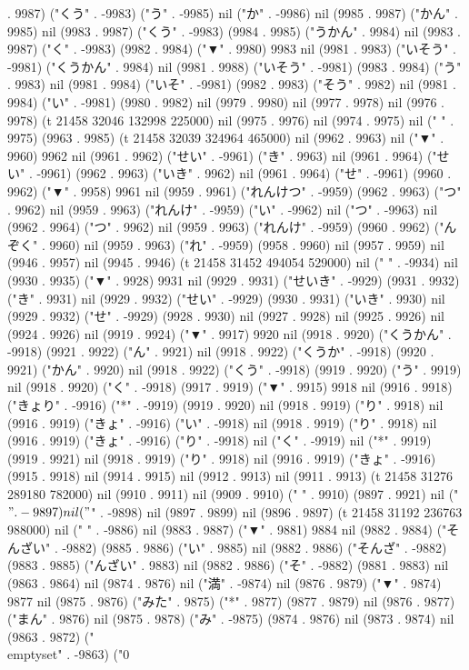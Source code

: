 . 9987) ("くう" . -9983) ("う" . -9985) nil ("か" . -9986) nil (9985 . 9987) ("かん" . 9985) nil (9983 . 9987) ("くう" . -9983) (9984 . 9985) ("うかん" . 9984) nil (9983 . 9987) ("く" . -9983) (9982 . 9984) ("▼" . 9980) 9983 nil (9981 . 9983) ("いそう" . -9981) ("くうかん" . 9984) nil (9981 . 9988) ("いそう" . -9981) (9983 . 9984) ("う" . 9983) nil (9981 . 9984) ("いそ" . -9981) (9982 . 9983) ("そう" . 9982) nil (9981 . 9984) ("い" . -9981) (9980 . 9982) nil (9979 . 9980) nil (9977 . 9978) nil (9976 . 9978) (t 21458 32046 132998 225000) nil (9975 . 9976) nil (9974 . 9975) nil (" " . 9975) (9963 . 9985) (t 21458 32039 324964 465000) nil (9962 . 9963) nil ("▼" . 9960) 9962 nil (9961 . 9962) ("せい" . -9961) ("き" . 9963) nil (9961 . 9964) ("せい" . -9961) (9962 . 9963) ("いき" . 9962) nil (9961 . 9964) ("せ" . -9961) (9960 . 9962) ("▼" . 9958) 9961 nil (9959 . 9961) ("れんけつ" . -9959) (9962 . 9963) ("つ" . 9962) nil (9959 . 9963) ("れんけ" . -9959) ("い" . -9962) nil ("つ" . -9963) nil (9962 . 9964) ("つ" . 9962) nil (9959 . 9963) ("れんけ" . -9959) (9960 . 9962) ("んぞく" . 9960) nil (9959 . 9963) ("れ" . -9959) (9958 . 9960) nil (9957 . 9959) nil (9946 . 9957) nil (9945 . 9946) (t 21458 31452 494054 529000) nil (" " . -9934) nil (9930 . 9935) ("▼" . 9928) 9931 nil (9929 . 9931) ("せいき" . -9929) (9931 . 9932) ("き" . 9931) nil (9929 . 9932) ("せい" . -9929) (9930 . 9931) ("いき" . 9930) nil (9929 . 9932) ("せ" . -9929) (9928 . 9930) nil (9927 . 9928) nil (9925 . 9926) nil (9924 . 9926) nil (9919 . 9924) ("▼" . 9917) 9920 nil (9918 . 9920) ("くうかん" . -9918) (9921 . 9922) ("ん" . 9921) nil (9918 . 9922) ("くうか" . -9918) (9920 . 9921) ("かん" . 9920) nil (9918 . 9922) ("くう" . -9918) (9919 . 9920) ("う" . 9919) nil (9918 . 9920) ("く" . -9918) (9917 . 9919) ("▼" . 9915) 9918 nil (9916 . 9918) ("きょり" . -9916) ("*" . -9919) (9919 . 9920) nil (9918 . 9919) ("り" . 9918) nil (9916 . 9919) ("きょ" . -9916) ("い" . -9918) nil (9918 . 9919) ("り" . 9918) nil (9916 . 9919) ("きょ" . -9916) ("り" . -9918) nil ("く" . -9919) nil ("*" . 9919) (9919 . 9921) nil (9918 . 9919) ("り" . 9918) nil (9916 . 9919) ("きょ" . -9916) (9915 . 9918) nil (9914 . 9915) nil (9912 . 9913) nil (9911 . 9913) (t 21458 31276 289180 782000) nil (9910 . 9911) nil (9909 . 9910) (" " . 9910) (9897 . 9921) nil ("$" . -9897) nil ("$" . -9898) nil (9897 . 9899) nil (9896 . 9897) (t 21458 31192 236763 988000) nil (" " . -9886) nil (9883 . 9887) ("▼" . 9881) 9884 nil (9882 . 9884) ("そんざい" . -9882) (9885 . 9886) ("い" . 9885) nil (9882 . 9886) ("そんざ" . -9882) (9883 . 9885) ("んざい" . 9883) nil (9882 . 9886) ("そ" . -9882) (9881 . 9883) nil (9863 . 9864) nil (9874 . 9876) nil ("満" . -9874) nil (9876 . 9879) ("▼" . 9874) 9877 nil (9875 . 9876) ("みた" . 9875) ("*" . 9877) (9877 . 9879) nil (9876 . 9877) ("まん" . 9876) nil (9875 . 9878) ("み" . -9875) (9874 . 9876) nil (9873 . 9874) nil (9863 . 9872) ("\\emptyset" . -9863) ("0
